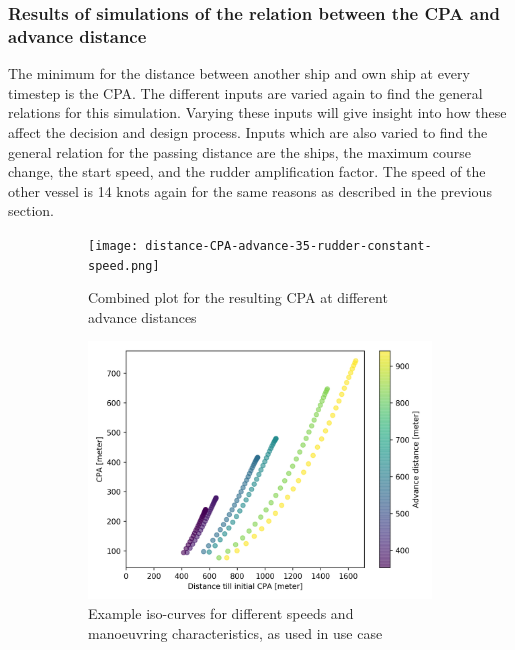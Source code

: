 \subsubsection{Results of simulations of the relation between the CPA and advance distance}
The minimum for the distance between another ship and own ship at every timestep is the \ac{CPA}. The different inputs are varied again to find the general relations for this simulation. Varying these inputs will give insight into how these affect the decision and design process.
Inputs which are also varied to find the general relation for the passing distance are the ships, the maximum course change, the start speed, and the rudder amplification factor. The speed of the other vessel is 14 knots again for the same reasons as described in the previous section.

\begin{figure}[!p]
	\centering
	\begin{subfigure}[b]{\textwidth}
		\centering
		\texttt{[image: distance-CPA-advance-35-rudder-constant-speed.png]}
		\caption{Combined plot for the resulting CPA at different advance distances}
		\label{fig:distance-CPA-advance}
	\end{subfigure}
	\begin{subfigure}[b]{0.6\linewidth}
		\includegraphics[width=\textwidth]{figure/distsance-CPA-course-50}
		\caption{Example iso-curves for different speeds and manoeuvring characteristics, as used in use case}
		\label{fig:distsance-cpa-course-50}
	\end{subfigure}
	\begin{subfigure}[b]{0.6\textwidth}

\end{subfigure}
\end{figure}
